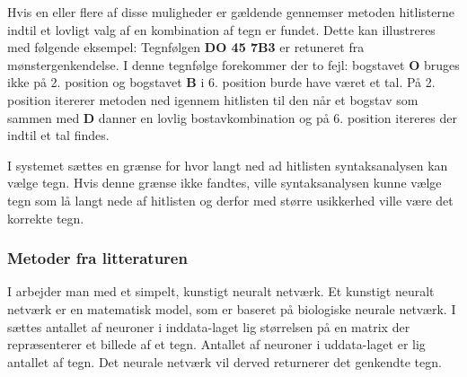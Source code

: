 Hvis en eller flere af disse muligheder er gældende gennemser metoden hitlisterne indtil et lovligt valg af en kombination af tegn er fundet. Dette kan illustreres med følgende eksempel: Tegnfølgen \textbf{DO 45 7B3} er retuneret fra mønstergenkendelse. I denne tegnfølge forekommer der to fejl: bogstavet \textbf{O} bruges ikke på 2. position og bogstavet \textbf{B} i 6. position burde have været et tal. På 2. position itererer metoden ned igennem hitlisten til den når et bogstav som sammen med \textbf{D} danner en lovlig bostavkombination og på 6. position itereres der indtil et tal findes.

I systemet sættes en grænse for hvor langt ned ad hitlisten syntaksanalysen kan vælge tegn. Hvis denne grænse ikke fandtes, ville syntaksanalysen kunne vælge tegn som lå langt nede af hitlisten og derfor med større usikkerhed ville være det korrekte tegn.


\subsubsection{Metoder fra litteraturen}

I \cite{kwas} arbejder man med et simpelt, kunstigt neuralt netværk. Et kunstigt neuralt netværk er en matematisk model, som er baseret på biologiske neurale netværk\cite{wiki_nn}. I \cite{kwas} sættes antallet af neuroner i inddata-laget lig størrelsen på en matrix der repræsenterer et billede af et tegn. Antallet af neuroner i uddata-laget er lig antallet af tegn. Det neurale netværk vil derved returnerer det genkendte tegn.